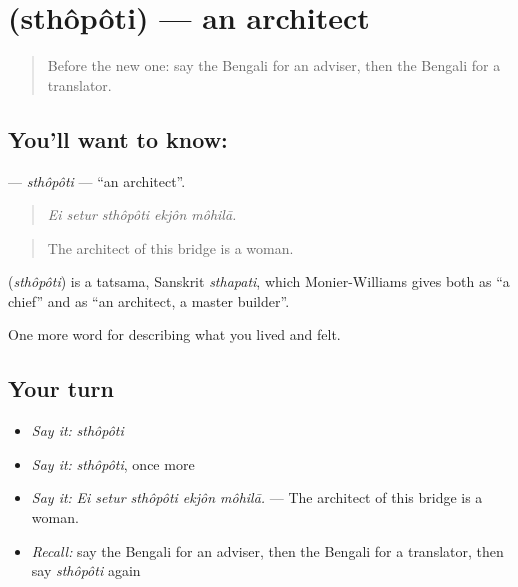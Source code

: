\section[\texorpdfstring{\bn{স্থপতি} (sthôpôti)}{স্থপতি (sthôpôti)}]{ (sthôpôti) — an architect}

\label{lesson:BN-C501-sthopoti}



\begin{quote}
Before the new one: say the Bengali for an adviser, then the Bengali for a translator.
\end{quote}

\subsection*{You'll want to know: }
\textbf{} — \emph{sthôpôti} — \textquotedblleft{}an architect\textquotedblright{}.

\begin{quote}
    
\end{quote}

\begin{quote}
\emph{Ei setur sthôpôti ekjôn môhilā.}
\end{quote}

\begin{quote}
The architect of this bridge is a woman.
\end{quote}

\begin{cousinweb}
\textbf{} (\emph{sthôpôti}) is a tatsama, Sanskrit \emph{sthapati}, which Monier-Williams gives both as \textquotedblleft{}a chief\textquotedblright{} and as \textquotedblleft{}an architect, a master builder\textquotedblright{}.
\end{cousinweb}

\begin{grammarlens}[title={What you've built}]
One more word for describing what you lived and felt.
\end{grammarlens}

\subsection*{Your turn}
\begin{itemize}
\raggedright
  \item \emph{Say it:} \emph{sthôpôti}
  \item \emph{Say it:} \emph{sthôpôti}, once more
  \item \emph{Say it:} \emph{Ei setur sthôpôti ekjôn môhilā.} — The architect of this bridge is a woman.
  \item \emph{Recall:} say the Bengali for an adviser, then the Bengali for a translator, then say \emph{sthôpôti} again
\end{itemize}

